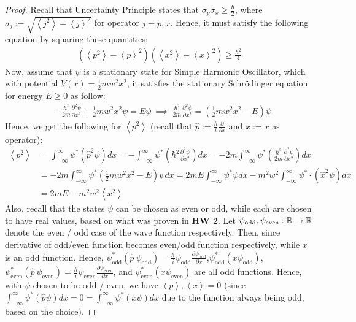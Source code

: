 \documentclass{article}
\begin{document}
\begin{proof}
    Recall that Uncertainty Principle states that $\sigma_p \sigma_x \geq \frac{\hbar}{2}$, where $\sigma_j:= \sqrt{\left<j^2\right>-\left<j\right>^2}$ for operator $j=p,x$. Hence, it must satisfy the following equation by squaring these quantities:
    \begin{align}
        \left(\left<p^2\right>-\left<p\right>^2\right)\left(\left<x^2\right>-\left<x\right>^2\right)\geq \frac{\hbar^2}{4}
    \end{align}
    Now, assume that $\psi$ is a stationary state for Simple Harmonic Oscillator, which with potential $V(x)=\frac{1}{2}mw^2 x^2$, it satisfies the stationary Schr\"{o}dinger equation for energy $E\geq 0$ as follow:
    \begin{align}
        &-\frac{\hbar^2}{2m}\frac{\partial^2\psi}{\partial x^2}+\frac{1}{2}mw^2 x^2\psi = E\psi\ \implies\  \frac{\hbar^2}{2m}\frac{\partial^2 \psi}{\partial x^2}=\left(\frac{1}{2}mw^2 x^2-E\right)\psi
    \end{align}
    Hence, we get the following for $\left<p^2\right>$ (recall that $\hat{p}:= \frac{\hbar}{i}\frac{\partial}{\partial x}$ and $\hat{x}:= x$ as operator):
    \begin{align}
        \left<p^2\right>&=\int_{-\infty}^{\infty}\psi^* \left(\hat{p}^2 \psi\right) dx=-\int_{-\infty}^{\infty}\psi^*\left(\hbar^2\frac{\partial^2\psi}{\partial x^2}\right)dx=-2m\int_{-\infty}^{\infty}\psi^*\left(\frac{\hbar^2}{2m}\frac{\partial^2\psi}{\partial x^2}\right)dx\\
        &= -2m\int_{-\infty}^{\infty}\psi^*\left(\frac{1}{2}mw^2x^2-E\right)\psi dx = 2mE\int_{-\infty}^{\infty}\psi^*\psi dx-m^2w^2\int_{-\infty}^{\infty}\psi^*\cdot (\hat{x}^2\psi)dx\\
        &= 2mE - m^2w^2 \left<x^2\right>
    \end{align}
    Also, recall that the states $\psi$ can be chosen as even or odd, while each are chosen to have real values, based on what was proven in \textbf{HW 2}. Let $\psi_\text{odd},\psi_\text{even}:\mathbb{R}\rightarrow\mathbb{R}$ denote the even / odd case of the wave function respectively. Then, since derivative of odd/even function becomes even/odd function respectively, while $x$ is an odd function. Hence, $\psi_\text{odd}^* (\hat{p}\ \psi_\text{odd}) = \frac{\hbar}{i}\psi_\text{odd}\frac{\partial \psi_\text{odd}}{\partial x}$,\quad $\psi^*_\text{odd}(x \psi_\text{odd})$, \quad $\psi^*_\text{even}(\hat{p}\ \psi_\text{even})=\frac{\hbar}{i}\psi_\text{even}\frac{\partial\psi_\text{even}}{\partial x}$, and $\psi^*_\text{even}(x\psi_\text{even})$ are all odd functions. Hence, with $\psi$ chosen to be odd / even, we have  $\left<p\right>,\left<x\right>=0$ (since $\int_{-\infty}^{\infty}\psi^*(\hat{p}\psi)dx =0= \int_{-\infty}^{\infty}\psi^*(x\psi)dx$ due to the function always being odd, based on the choice).


\end{proof}
\end{document}
